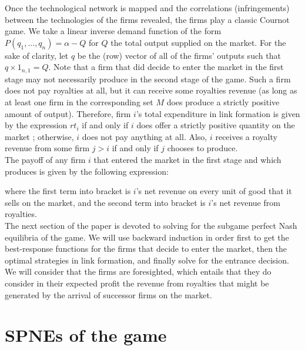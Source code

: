 \documentclass{article}
\begin{document}
\indent Once the technological network is mapped and the correlations (infringements) between the technologies of the firms revealed, the firms play a classic Cournot game. We take a linear inverse demand function of the form $P(q_1,...,q_n)=\alpha - Q$ for $Q$ the total output supplied on the market. For the sake of clarity, let $q$ be the (row) vector of all of the firms' outputs such that $q\times 1_{n,1}=Q$. Note that a firm that did decide to enter the market in the first stage may not necessarily produce in the second stage of the game. Such a firm does not pay royalties at all, but it can receive some royalties revenue (as long as at least one firm in the corresponding set $M$ does produce a strictly positive amount of output). Therefore, firm $i$'s total expenditure in link formation is given by the expression $r t_i$ if and only if $i$ does offer a strictly positive quantity on the market ; otherwise, $i$ does not pay anything at all. Also, $i$ receives a royalty revenue from some firm $j>i$ if and only if $j$ chooses to produce.\\

The payoff of any firm $i$ that entered the market in the first stage and which produces is given by the following expression: 

where the first term into bracket is $i$'s net revenue on every unit of good that it sells on the market, and the second term into bracket is $i$'s net revenue from royalties. \\

\indent The next section of the paper is devoted to solving for the subgame perfect Nash equilibria of the game. We will use backward induction in order first to get the best-response functions for the firms that decide to enter the market, then the optimal strategies in link formation, and finally solve for the entrance decision. We will consider that the firms are foresighted, which entails that they do consider in their expected profit the revenue from royalties that might be generated by the arrival of successor firms on the market. 

\section{SPNEs of the game }
\end{document}
